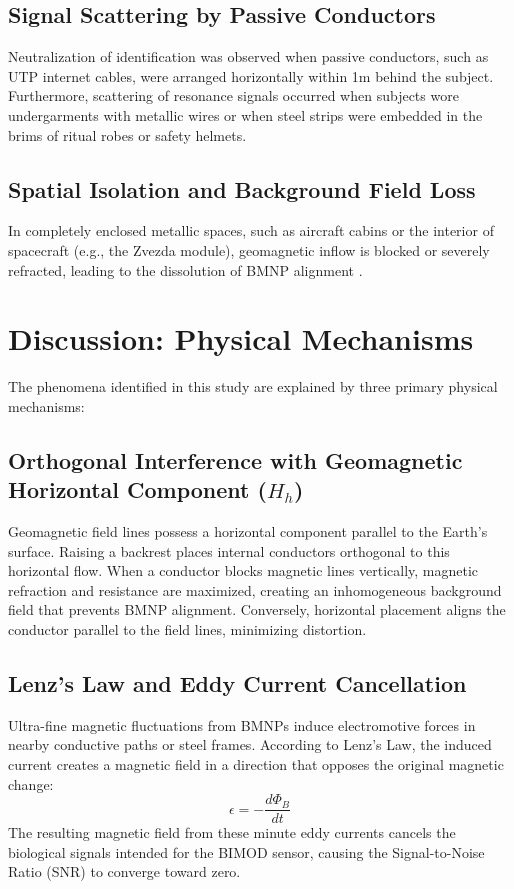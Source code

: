 \documentclass[11pt,a4paper]{article}
\begin{document}
\subsection{Signal Scattering by Passive Conductors}
Neutralization of identification was observed when passive conductors, such as UTP internet cables, were arranged horizontally within 1m behind the subject. Furthermore, scattering of resonance signals occurred when subjects wore undergarments with metallic wires or when steel strips were embedded in the brims of ritual robes or safety helmets.

\subsection{Spatial Isolation and Background Field Loss}
In completely enclosed metallic spaces, such as aircraft cabins or the interior of spacecraft (e.g., the Zvezda module), geomagnetic inflow is blocked or severely refracted, leading to the dissolution of BMNP alignment \cite{yoon2026_400}.

\section{Discussion: Physical Mechanisms}
The phenomena identified in this study are explained by three primary physical mechanisms:

\subsection{Orthogonal Interference with Geomagnetic Horizontal Component ($H_h$)}
Geomagnetic field lines possess a horizontal component parallel to the Earth's surface. Raising a backrest places internal conductors orthogonal to this horizontal flow. When a conductor blocks magnetic lines vertically, magnetic refraction and resistance are maximized, creating an inhomogeneous background field that prevents BMNP alignment. Conversely, horizontal placement aligns the conductor parallel to the field lines, minimizing distortion.

\subsection{Lenz's Law and Eddy Current Cancellation}
Ultra-fine magnetic fluctuations from BMNPs induce electromotive forces in nearby conductive paths or steel frames. According to Lenz's Law, the induced current creates a magnetic field in a direction that opposes the original magnetic change:
$$ \epsilon = - \frac{d\Phi_B}{dt} $$
The resulting magnetic field from these minute eddy currents cancels the biological signals intended for the BIMOD sensor, causing the Signal-to-Noise Ratio (SNR) to converge toward zero.
\end{document}
